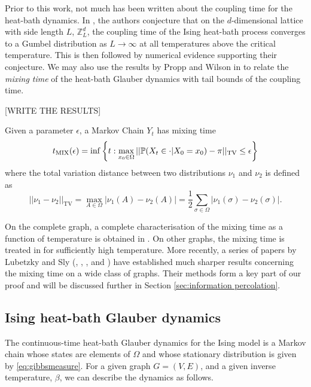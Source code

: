 	Prior to this work, not much has been written about the coupling time for the heat-bath dynamics. In \cite[Conjecture 7.1]{Collevecchio2017-nq}, the authors conjecture that on the $d$-dimensional lattice with side length $L$, $\mathbb{Z}^d_L$, the coupling time of the Ising heat-bath process converges to a Gumbel distribution as $L \rightarrow \infty$ at all temperatures above the critical temperature. This is then followed by numerical evidence supporting their conjecture. We may also use the results by Propp and Wilson in \cite[Section 5]{Propp1996-cf} to relate the \emph{mixing time} of the heat-bath Glauber dynamics with tail bounds of the coupling time.

	[WRITE THE RESULTS]

	Given a parameter $\epsilon$, a Markov Chain $Y_t$ has mixing time
	\begin{equation}
	\label{eq:mixing time definition}
		t_\mathrm{MIX}(\epsilon) = \inf\left\{t: \max_{x_0 \in \Omega} ||\mathbb{P}(X_t \in \cdot | X_0 = x_0) - \pi ||_\mathrm{TV} \leq \epsilon \right\}
	\end{equation}
	where the total variation distance between two distributions $\nu_1$ and $\nu_2$ is defined as 
	\begin{equation}
		||\nu_1 - \nu_2||_\mathrm{TV} = \max_{A \in \Omega}|\nu_1(A) - \nu_2(A)| = \frac{1}{2}\sum_{\sigma \in \Omega} |\nu_1(\sigma) - \nu_2(\sigma)|.
	\end{equation}

	
	On the complete graph, a complete characterisation of the mixing time as a function of temperature is obtained in \cite{Ding2009-du}. On other graphs, the mixing time is treated in \cite{Martinelli1994-bv} for sufficiently high temperature. More recently, a series of papers by Lubetzky and Sly (\cite{Lubetzky2013-yv}, \cite{Lubetzky2015-po}, \cite{Lubetzky2016-wd}, and \cite{Lubetzky2017-nc}) have established much sharper results concerning the mixing time on a wide class of graphs. Their methods form a key part of our proof and will be discussed further in Section \ref{sec:information percolation}.

	\subsection{Ising heat-bath Glauber dynamics}
	\label{sec:heat-bath glauber dynamics definition}
	The continuous-time heat-bath Glauber dynamics for the Ising model is a Markov chain whose states are elements of $\Omega$ and whose stationary distribution is given by \eqref{eq:gibbsmeasure}. For a given graph $G = (V, E)$, and a given inverse temperature, $\beta$, we can describe the dynamics as follows. 

